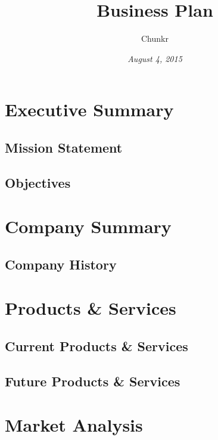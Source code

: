 \documentclass[titlepage]{article}
\begin{document}
\title{\Huge \textbf{Business Plan}}
\date{\emph{August 4, 2015}}
\author{\Large Chunkr}
\maketitle

\tableofcontents

\section{Executive Summary}
\subsection{Mission Statement}
\subsection{Objectives}

\section{Company Summary}
\subsection{Company History}

\section{Products \& Services}
\subsection{Current Products \& Services}
\subsection{Future Products \& Services}

\section{Market Analysis}
\end{document}
